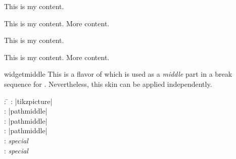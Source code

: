 \begin{dispExample}
\begin{tcbraster}[widget,skin=widgetfirst,raster equal height,raster columns=4,
    colback=LightGreen,colframe=DarkGreen,
    left=1mm,right=1mm,top=1mm,bottom=1mm,middle=1mm]
  \begin{tcolorbox}
    This is my content.
  \end{tcolorbox}
  \begin{tcolorbox}
    This is my content.
    \tcblower
    More content.
  \end{tcolorbox}
  \begin{tcolorbox}[adjusted title=My title]
    This is my content.
  \end{tcolorbox}
  \begin{tcolorbox}[adjusted title=My title]
    This is my content.
    \tcblower
    More content.
  \end{tcolorbox}
\end{tcbraster}
\end{dispExample}

\clearpage

\begin{docSkin}{widgetmiddle}
This is a flavor of  which is used as a \emph{middle} part
in a break sequence for .
Nevertheless, this skin can be applied independently.
\begin{tcolorbox}[skintable=widgetmiddle]
  \begin{tabbing}
    : \=\kill
    :  \> |tikzpicture|\\ 
    :           \> |pathmiddle|\\
    : \> |pathmiddle|\\ 
    :        \> |pathmiddle|\\
    :    \> \emph{special}\\
    :           \> \emph{special}
  \end{tabbing}
\end{tcolorbox}
\end{docSkin}

